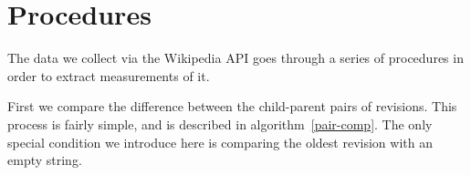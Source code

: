 \section{Procedures}
The data we collect via the Wikipedia API goes through a series of
procedures in order to extract measurements of it.

First we compare the difference between the child-parent pairs of
revisions. This process is fairly simple, and is described in
algorithm~\ref{pair-comp}. The only special condition we introduce
here is comparing the oldest revision with an empty string.
